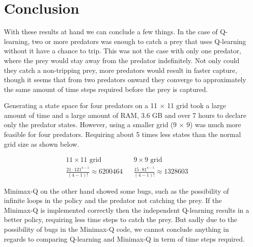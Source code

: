 \section{Conclusion}
With these results at hand we can conclude a few things. In the case of Q-learning, two or more predators was enough to catch a prey that uses Q-learning without it have a chance to trip. This was not the case with only one predator, where the prey would stay away from the predator indefinitely. 
Not only could they catch a non-tripping prey, more predators would result in faster capture, though it seems that from two predators onward they converge to approximately the same amount of time steps required before the prey is captured.

Generating a state space for four predators on a 11 $\times$ 11 grid took a large amount of time and a large amount of RAM, 3.6 GB and over 7 hours to declare only the predator states. However, using a smaller grid (9 $\times$ 9) was much more feasible for four predators. Requiring about 5 times less states than the normal grid size as shown below.

\begin{align*}
11 \times 11 \text{ grid} & & 9 \times 9 \text{ grid}\\
\frac{21\cdot 121^{4-1}}{(4-1)!} \approx 6200464 & & \frac{15\cdot 81^{4-1}}{(4-1)!} \approx 1328603
\end{align*}

Minimax-Q on the other hand showed some bugs, such as the possibility of infinite loops in the policy and the predator not catching the prey. If the Minimax-Q is implemented correctly then the independent Q-learning results in a better policy, requiring less time steps to catch the prey. But sadly due to the possibility of bugs in the Minimax-Q code, we cannot conclude anything in regards to comparing Q-learning and Minimax-Q in term of time steps required. 
